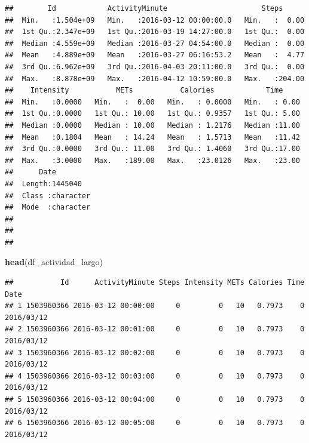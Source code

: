 \documentclass[
]{article}
\newenvironment{Shaded}{\begin{snugshade}}{\end{snugshade}}
\newcommand{\CommentTok}[1]{\textcolor[rgb]{0.56,0.35,0.01}{\textit{#1}}}
\newcommand{\FunctionTok}[1]{\textcolor[rgb]{0.13,0.29,0.53}{\textbf{#1}}}
\newcommand{\NormalTok}[1]{#1}
\newcommand{\OtherTok}[1]{\textcolor[rgb]{0.56,0.35,0.01}{#1}}
\newcommand{\SpecialCharTok}[1]{\textcolor[rgb]{0.81,0.36,0.00}{\textbf{#1}}}
\begin{document}
\begin{Shaded}
\end{Shaded}

\begin{verbatim}
##        Id            ActivityMinute                      Steps       
##  Min.   :1.504e+09   Min.   :2016-03-12 00:00:00.0   Min.   :  0.00  
##  1st Qu.:2.347e+09   1st Qu.:2016-03-19 14:27:00.0   1st Qu.:  0.00  
##  Median :4.559e+09   Median :2016-03-27 04:54:00.0   Median :  0.00  
##  Mean   :4.889e+09   Mean   :2016-03-27 06:16:53.2   Mean   :  4.77  
##  3rd Qu.:6.962e+09   3rd Qu.:2016-04-03 20:11:00.0   3rd Qu.:  0.00  
##  Max.   :8.878e+09   Max.   :2016-04-12 10:59:00.0   Max.   :204.00  
##    Intensity           METs           Calories            Time      
##  Min.   :0.0000   Min.   :  0.00   Min.   : 0.0000   Min.   : 0.00  
##  1st Qu.:0.0000   1st Qu.: 10.00   1st Qu.: 0.9357   1st Qu.: 5.00  
##  Median :0.0000   Median : 10.00   Median : 1.2176   Median :11.00  
##  Mean   :0.1804   Mean   : 14.24   Mean   : 1.5713   Mean   :11.42  
##  3rd Qu.:0.0000   3rd Qu.: 11.00   3rd Qu.: 1.4060   3rd Qu.:17.00  
##  Max.   :3.0000   Max.   :189.00   Max.   :23.0126   Max.   :23.00  
##      Date          
##  Length:1445040    
##  Class :character  
##  Mode  :character  
##                    
##                    
## 
\end{verbatim}

\begin{Shaded}
\begin{Highlighting}[]
\FunctionTok{head}\NormalTok{(df\_actividad\_largo)}
\end{Highlighting}
\end{Shaded}

\begin{verbatim}
##           Id      ActivityMinute Steps Intensity METs Calories Time       Date
## 1 1503960366 2016-03-12 00:00:00     0         0   10   0.7973    0 2016/03/12
## 2 1503960366 2016-03-12 00:01:00     0         0   10   0.7973    0 2016/03/12
## 3 1503960366 2016-03-12 00:02:00     0         0   10   0.7973    0 2016/03/12
## 4 1503960366 2016-03-12 00:03:00     0         0   10   0.7973    0 2016/03/12
## 5 1503960366 2016-03-12 00:04:00     0         0   10   0.7973    0 2016/03/12
## 6 1503960366 2016-03-12 00:05:00     0         0   10   0.7973    0 2016/03/12
\end{verbatim}
\end{document}
